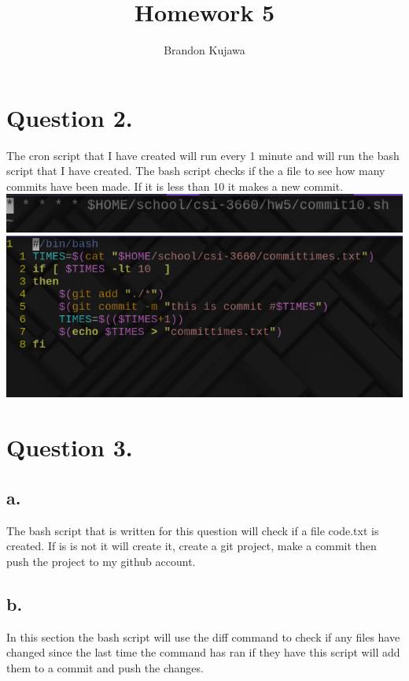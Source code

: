 \documentclass{article}
\title{Homework 5}
\author{Brandon Kujawa}
\begin{document}
\maketitle

\section*{Question 2.}
The cron script that I have created will run every 1 minute and will run the bash script that I have created. The bash script checks if the a file to see how many commits have been made. If it is less than 10 it makes a new commit.
\includegraphics[scale=.45]{crontab.png} \\
\includegraphics[scale=.45]{commitscript.png}

\section*{Question 3.}
\subsection*{a.}
The bash script that is written for this question will check if a file code.txt is created. If is is not it will create it, create a git project, make a commit then push the project to my github account.
\subsection*{b.}
In this section the bash script will use the diff command to check if any files have changed since the last time the command has ran if they have this script will add them to a commit and push the changes.
\end{document}
